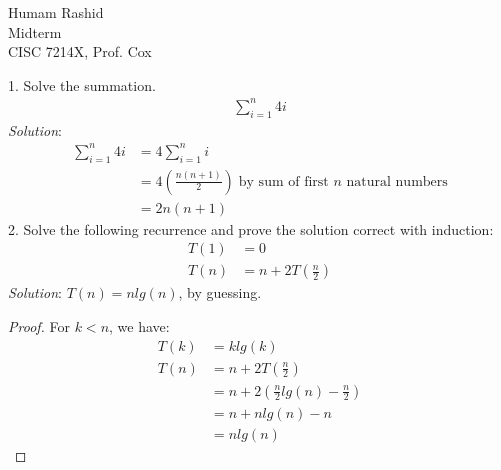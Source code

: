 \documentclass{scrartcl}
\begin{document}
\begin{flushleft}

    Humam Rashid\\
    Midterm\\
    CISC 7214X, Prof. Cox\\
    \bigskip
    
    1. Solve the summation.
    \begin{align*}
        \sum_{i=1}^{n} 4i
    \end{align*}
    \textit{Solution}:
    \begin{align*}
        \sum_{i=1}^{n} 4i &= 4 \sum_{i=1}^{n} i\\
                          &= 4 (\frac{n (n + 1)}{2})\;\text{by sum of first $n$ natural numbers}\\
                          &= 2n(n + 1)
    \end{align*}
    2. Solve the following recurrence and prove the solution correct with induction:
    \begin{align*}
        T(1) &= 0\\
        T(n) &= n + 2 T(\frac{n}{2})
    \end{align*}
    \textit{Solution}: $T(n) = n lg(n)$, by guessing.
    \medskip
    \begin{proof}
        For $k < n$, we have:\\
        \begin{align*}
            T(k) &= k lg(k)\\
            T(n) &= n + 2 T(\frac{n}{2})\\
                 &= n + 2 (\frac{n}{2} lg(n) - \frac{n}{2})\\
                 &= n + n lg(n) - n\\
                 &= n lg(n)
        \end{align*}
    \end{proof}

\end{flushleft}
\end{document}
